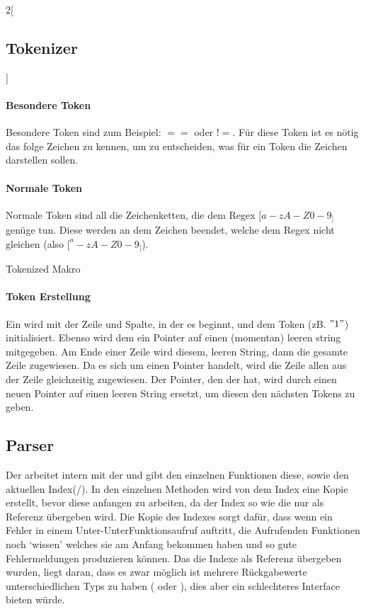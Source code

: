\begin{paracol}{2}[\subsection{Tokenizer}]
      \paragraph{Besondere Token}
        Besondere Token sind zum Beispiel: \myMIn$==$ oder \myMIn$!=$. Für diese Token ist es nötig das folge Zeichen zu kennen, um zu entscheiden, was für ein Token die Zeichen darstellen sollen.

      \paragraph{Normale Token}
        Normale Token sind all die Zeichenketten, die dem Regex \myRIn$[a-zA-Z0-9_]$ genüge tun. Diese werden an dem Zeichen beendet, welche dem Regex nicht gleichen (also \myRIn$[^a-zA-Z0-9_]$).

    \switchcolumn
      \begin{myCodeEnv}
        \begin{myInvBox}[width=.9\linewidth]
          
        \caption{Tokenized Makro}
        \label{fig:extok}
        \end{myInvBox}
      \end{myCodeEnv}
  \end{paracol}

  \paragraph{Token Erstellung}
    Ein  wird mit der Zeile und Spalte, in der es beginnt, und dem Token (zB. \myMIn$"1 "$) initialisiert. Ebenso wird dem  ein Pointer auf einen (momentan) leeren string mitgegeben. Am Ende einer Zeile wird diesem, leeren String, dann die gesamte Zeile zugewiesen. Da es sich um einen Pointer handelt, wird die Zeile allen  aus der Zeile gleichzeitig zugewiesen. Der Pointer, den der  hat, wird durch einen neuen Pointer auf einen leeren String ersetzt, um diesen den nächsten Tokens zu geben.

  \subsection{Parser}
  \label{ssec:Parser}
    Der  arbeitet intern mit der  und gibt den einzelnen Funktionen diese, sowie den aktuellen Index(/). In den einzelnen Methoden wird von dem Index eine Kopie erstellt, bevor diese anfangen zu arbeiten, da der Index so wie die  nur als Referenz übergeben wird. Die Kopie des Indexes sorgt dafür, dass wenn ein Fehler in einem Unter-UnterFunktionsaufruf auftritt, die Aufrufenden Funktionen noch `wissen' welches  sie am Anfang bekommen haben und so gute Fehlermeldungen produzieren können. Das die Indexe als Referenz übergeben wurden, liegt daran, dass es zwar möglich ist mehrere Rückgabewerte unterschiedlichen Typs zu haben ( oder ), dies aber ein schlechteres Interface bieten würde.


